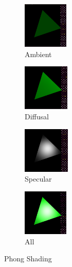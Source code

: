 \documentclass{article}
\begin{document}
\begin{figure}[h!]
    \centering
    \begin{subfigure}[b]{0.20\textwidth}
        \includegraphics[width=\textwidth, height=2.2cm, keepaspectratio]{amb.png}
        \caption*{Ambient}
        \label{fig:amb}
    \end{subfigure}%
    \begin{subfigure}[b]{0.20\textwidth}
        \includegraphics[width=\textwidth, height=2.2cm, keepaspectratio]{dif.png}
        \caption*{Diffusal}
        \label{fig:dif}
    \end{subfigure}
    \begin{subfigure}[b]{0.20\textwidth}
        \includegraphics[width=\textwidth, height=2.2cm, keepaspectratio]{spe.png}
        \caption*{Specular}
        \label{fig:spe}
    \end{subfigure}
    \begin{subfigure}[b]{0.20\textwidth}
        \includegraphics[width=\textwidth, height=2.2cm, keepaspectratio]{all.png}
        \caption*{All}
        \label{fig:all}
    \end{subfigure}
    \caption{Phong Shading}\label{fig:phongshade}
\end{figure}
\end{document}
